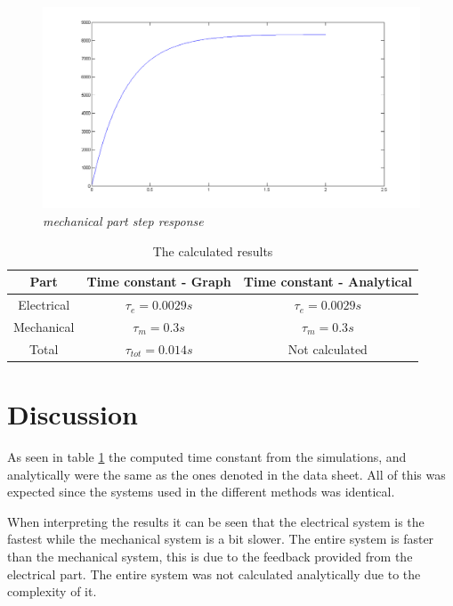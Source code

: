\documentclass[12pt,a4paper]{article}
\begin{document}
\begin{figure}[h]
\centering
  \includegraphics[width=1\linewidth]{mechanicalsim.png}
  \caption{\emph{mechanical part step response}}
  \label{fig:mechanical}
\end{figure}

\begin{table}[Ht!]
\caption{\label{table:results}The calculated results}
\begin{center}
\begin{tabular}{ |c|c|c| }
 \hline
 \textbf{Part} & \textbf{Time constant - Graph} & \textbf{Time constant - Analytical} \\
 \hline
 Electrical & $\tau_{e} = 0.0029 s$ & $\tau_{e} = 0.0029 s$ \\
 Mechanical & $\tau_{m} = 0.3 s$ & $\tau_{m} = 0.3 s$\\
 Total & $\tau_{tot} = 0.014 s$ & Not calculated\\
 \hline
\end{tabular}
\end{center}
\end{table}
\section{Discussion}
As seen in table \ref{table:results} the computed time constant from the simulations, and analytically were the same as the ones denoted in the data sheet. All of this was expected since the systems used in the different methods was identical.

When interpreting the results it can be seen that the electrical system is the fastest while the mechanical system is a bit slower. The entire system is faster than the mechanical system, this is due to the feedback provided from the electrical part. The entire system was not calculated analytically due to the complexity of it.
\end{document}
